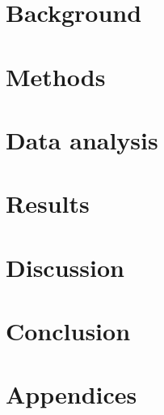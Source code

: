 





\chapter{Background}








\chapter{Methods}


\chapter{Data analysis}

\chapter{Results}

\chapter{Discussion}

\chapter{Conclusion}

\printbibliography

\chapter{Appendices}

\begin{appendices}

\end{appendices}


